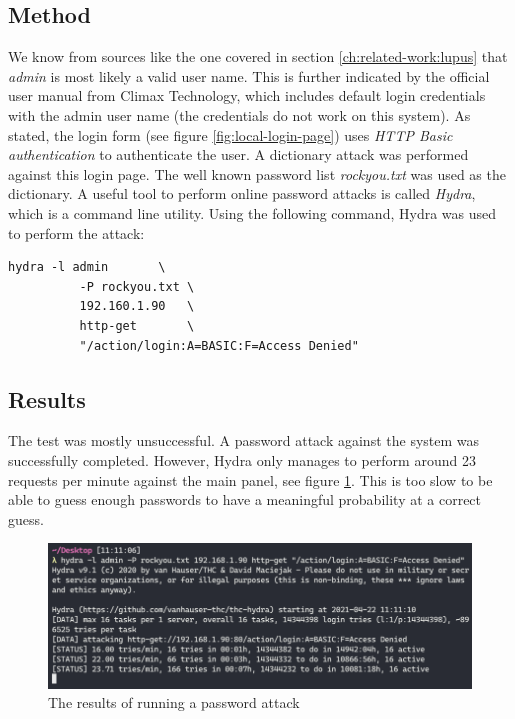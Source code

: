 \subsection{Method}
We know from sources like the one covered in section \ref{ch:related-work:lupus} that \textit{admin} is most likely a valid user name. This is further indicated by the official user manual from Climax Technology, which includes default login credentials with the admin user name (the credentials do not work on this system). As stated, the login form (see figure \ref{fig:local-login-page}) uses \textit{HTTP Basic authentication} to authenticate the user. A dictionary attack was performed against this login page. The well known password list \textit{rockyou.txt} was used as the dictionary. A useful tool to perform online password attacks is called \textit{Hydra}, which is a command line utility. Using the following command, Hydra was used to perform the attack:
\begin{lstlisting}[frame=tb]
    hydra -l admin       \
          -P rockyou.txt \
          192.160.1.90   \
          http-get       \
          "/action/login:A=BASIC:F=Access Denied"
\end{lstlisting}

\subsection{Results}
The test was mostly unsuccessful. A password attack against the system was successfully completed. However, Hydra only manages to perform around 23 requests per minute against the main panel, see figure \ref{fig:hydra-password-attack}. This is too slow to be able to guess enough passwords to have a meaningful probability at a correct guess.
\begin{figure}[!ht]
    \centering
    \includegraphics[width=\textwidth]{images/6-pentesting/hydra-results.png}
    \caption{The results of running a password attack}
    \label{fig:hydra-password-attack}
\end{figure}

